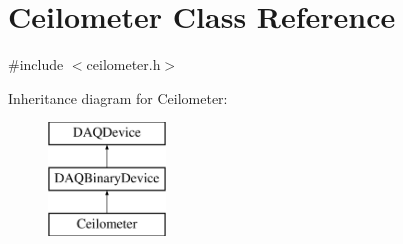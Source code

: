 \hypertarget{classCeilometer}{\section{Ceilometer Class Reference}
\label{classCeilometer}
}


{\ttfamily \#include $<$ceilometer.\-h$>$}

Inheritance diagram for Ceilometer\-:\begin{figure}[H]
\begin{center}
\leavevmode
\includegraphics[height=3.000000cm]{classCeilometer}
\end{center}
\end{figure}
